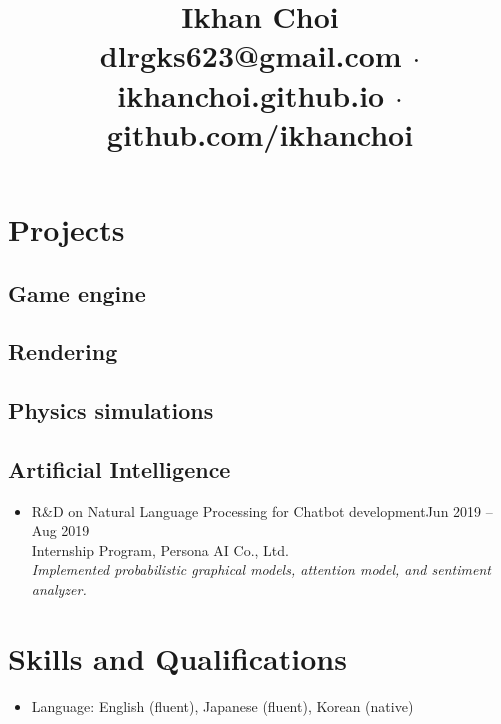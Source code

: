 \documentclass[11pt,a4paper]{article}
\title{\vspace{-40pt}
	Ikhan Choi\\[5pt] \small
	\faEnvelopeSquare\quad dlrgks623@gmail.com
	\quad$\cdot$\quad
	\faHome\quad ikhanchoi.github.io
	\quad$\cdot$\quad
	\faGithub\quad github.com/ikhanchoi
	\vspace{-5em}}
\date{}
\begin{document}
\maketitle



\section*{Projects}

\subsection*{Game engine}

\subsection*{Rendering }

\subsection*{Physics simulations}

\subsection*{Artificial Intelligence}
\begin{itemize}
\item
	R\&D on Natural Language Processing for Chatbot development\hfill{\small Jun 2019 -- Aug 2019}\\
	Internship Program, Persona AI Co., Ltd.\\
	\textit{Implemented probabilistic graphical models, attention model, and sentiment analyzer.}
\end{itemize}





\section*{Skills and Qualifications}
\begin{itemize}
\item Language: English (fluent), Japanese (fluent), Korean (native)
\end{itemize}
	
\end{document}
